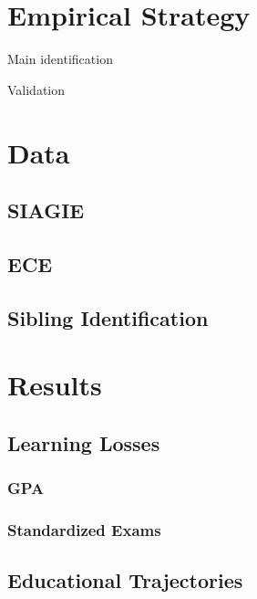 
\section{Empirical Strategy}\label{sec:empirical_strategy}

Main identification


Validation 


\section{Data}\label{sec:data}

\subsection{SIAGIE}

\subsection{ECE}

\subsection{Sibling Identification}

\section{Results}\label{sec:results}

\subsection{Learning Losses}

\subsubsection{GPA}

\subsubsection{Standardized Exams}

\subsection{Educational Trajectories}

